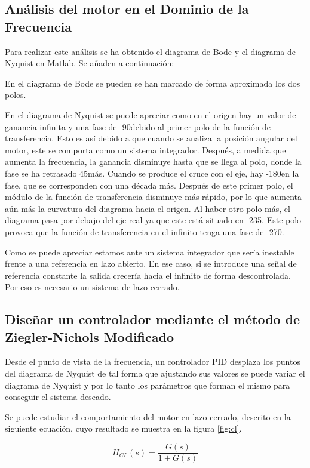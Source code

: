\documentclass[a4paper]{article}
\begin{document}
\subsection{Análisis del motor en el Dominio de la Frecuencia}
Para realizar este análisis se ha obtenido el diagrama de Bode y el diagrama de Nyquist en Matlab. Se añaden a continuación:

En el diagrama de Bode se pueden se han marcado de forma aproximada los dos polos.

En el diagrama de Nyquist se puede apreciar como en el origen hay un valor de ganancia infinita y una fase de -90\degree debido al primer polo de la función de transferencia. Esto es así debido a que cuando se analiza la posición angular del motor, este se comporta como un sistema integrador. Después, a medida que aumenta la frecuencia, la ganancia disminuye hasta que se llega al polo, donde la fase se ha retrasado 45\degree más. Cuando se produce el cruce con el eje, hay -180\degree en la fase, que se corresponden con una década más. Después de este primer polo, el módulo de la función de transferencia disminuye más rápido, por lo que aumenta aún más la curvatura del diagrama hacia el origen. Al haber otro polo más, el diagrama pasa por debajo del eje real ya que este está situado en -235\degree. Este polo provoca que la función de transferencia en el infinito tenga una fase de -270\degree.

Como se puede apreciar estamos ante un sistema integrador que sería inestable frente a una referencia en lazo abierto. En ese caso, si se introduce una señal de referencia constante la salida crecería hacia el infinito de forma descontrolada. Por eso es necesario un sistema de lazo cerrado.

\subsection{Diseñar un controlador mediante el método de Ziegler-Nichols Modificado}
Desde el punto de vista de la frecuencia, un controlador PID desplaza los puntos del diagrama de Nyquist de tal forma que ajustando sus valores se puede variar el diagrama de Nyquist y por lo tanto los parámetros que forman el mismo para conseguir el sistema deseado.

Se puede estudiar el comportamiento del motor en lazo cerrado, descrito en la siguiente ecuación, cuyo resultado se muestra en la figura \ref{fig:cl}.

\begin{equation}
H_{CL}(s)=\frac{G(s)}{1 + G(s)}
\end{equation}
\end{document}
